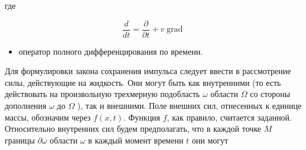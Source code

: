 \documentclass[10pt]{article}
\begin{document}
где



\[

\frac{d}{d t}=\frac{\partial}{\partial t}+v \operatorname{grad}

\]



\begin{itemize}

  \item оператор полного дифференцирования по времени.

\end{itemize}



Для формулировки закона сохранения импульса следует ввести в рассмотрение силы, действующие на жидкость. Они могут быть как внутренними (то есть действовать на произвольную трехмерную подобласть $\omega$ области $\Omega$ со стороны дополнения $\omega$ до $\Omega$ ), так и внешними. Поле внешних сил, отнесенных к единице массы, обозначим через $f(x, t)$. Функция $f$, как правило, считается заданной. Относительно внутренних сил будем предполагать, что в каждой точке $M$ границы $\partial \omega$ области $\omega$ в каждый момент времени $t$ они могут
\end{document}
